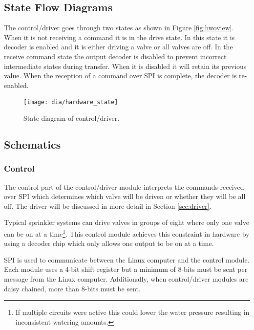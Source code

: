 \documentclass{article}
\begin{document}
\pagebreak

\subsection{State Flow Diagrams}

The control/driver goes through two states as shown
in Figure \ref{fig:hwoview}.
When it is not receiving a command it is in the drive state.
In this state it is decoder is enabled and it is either driving
a valve or all valves are off.
In the receive command state the output decoder is disabled to
prevent incorrect intermediate states during transfer.
When it is disabled it will retain its previous value.
When the reception of a command over SPI is complete, the decoder
is re-enabled.

\begin{figure}[h!]
\centering
\texttt{[image: dia/hardware\_state]}
\caption{State diagram of control/driver.}\label{fig:hwstate}
\end{figure}


\clearpage
\FloatBarrier
\subsection{Schematics}

\FloatBarrier
\subsubsection{Control}
\label{sec:control}

The control part of the control/driver module interprets the commands
received over SPI which determines which valve will be driven or whether
they will be all off.
The driver will be discussed in more detail in Section \ref{sec:driver}.

Typical sprinkler systems can drive valves in groups of eight where only
one valve can be on at a
time\footnote{If multiple circuits were active this could lower the
water pressure resulting in inconsistent watering amounts.}.
This control module achieves this constraint in hardware by using a
decoder chip which only allows one output to be on at a time.

SPI is used to communicate between the Linux computer and the control
module.
Each module uses a 4-bit shift register but a minimum of 8-bits must
be sent per message from the Linux computer.
Additionally, when control/driver modules are daisy chained, more than
8-bits must be sent.
\end{document}
